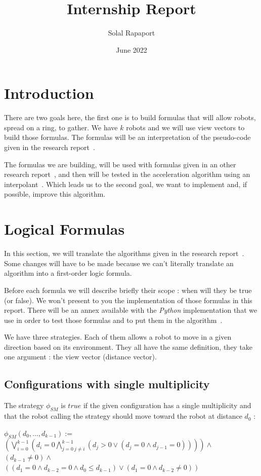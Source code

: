 \documentclass{article}
\title{Internship Report}
\author{Solal Rapaport }
\date{June 2022}
\begin{document}
\maketitle
\doublespacing
\tableofcontents
\singlespacing
\newpage

\section{Introduction}

There are two goals here, the first one is to build formulas that will allow robots, spread on a ring, to gather. We have $k$ robots and we will use view vectors to build those formulas. The formulas will be an interpretation of the pseudo-code given in the research report~\cite{gathering}.

The formulas we are building, will be used with formulas given in an other research report~\cite{algo}, and then will be tested in the acceleration algorithm using an interpolant~\cite{algo}. Which leads us to the second goal, we want to implement and, if possible, improve this algorithm.

\section{Logical Formulas}

In this section, we will translate the algorithms given in the research report~\cite{gathering}. Some changes will have to be made because we can't literally translate an algorithm into a first-order logic formula.

Before each formula we will describe briefly their scope : when will they be true (or false). We won't present to you the implementation of those formulas in this report. There will be an annex available with the \textit{Python} implementation that we use in order to test those formulas and to put them in the algorithm~\cite{algo}.

We have three strategies. Each of them allows a robot to move in a given direction based on its environment. They all have the same definition, they take one argument : the view vector (distance vector).

\subsection{Configurations with single multiplicity}

The strategy $\phi_{SM}$ is $true$ if the given configuration has a single multiplicity and that the robot calling the strategy should move toward the robot at distance $d_{0}$ :
\begin{center}
$\phi_{SM}(d_0, \ldots , d_{k-1}):=$\\
$(\bigvee_{i=0}^{k-1}(d_i = 0\bigwedge_{j=0\ j\not=i}^{k-1} (d_j > 0 \lor (d_j = 0 \land d_{j-1} = 0) ) ))\land$\\
$(d_{k-1} \not= 0) \land $\\
$((d_1 = 0 \land d_{k-2} = 0 \land d_0 \leq d_{k-1}) \lor (d_1 = 0 \land d_{k-2} \not= 0))$
\end{center}
\end{document}
